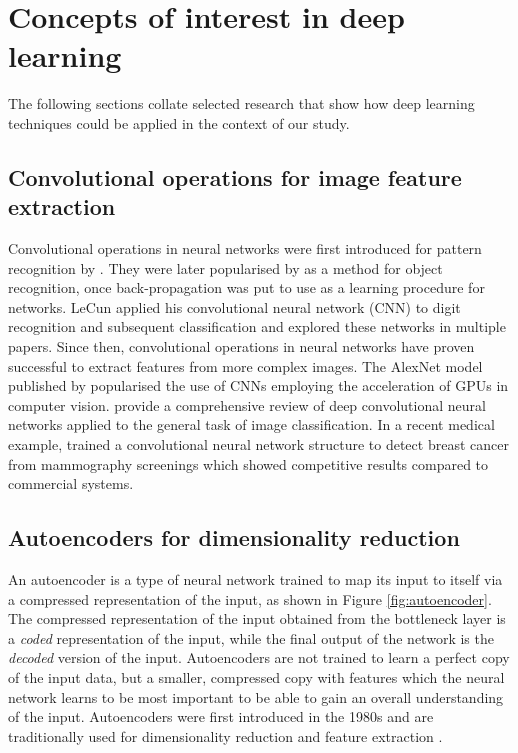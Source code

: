 \section{Concepts of interest in deep learning} \label{sec:deepl_bg}

The following sections collate selected research that show how deep learning techniques could be applied in the context of our study. 

\subsection{Convolutional operations for image feature extraction}

Convolutional operations in neural networks were first introduced for pattern recognition by \citet{fukushima_neocognitron_1980}. They were later popularised by \citet{lecun_1989} as a method for object recognition, once back-propagation was put to use as a learning procedure for networks. LeCun applied his convolutional neural network (CNN) to digit recognition and subsequent classification and explored these networks in multiple papers. Since then, convolutional operations in neural networks have proven successful to extract features from more complex images. The AlexNet model published by \citet{krizhevsky_imagenet_2012} popularised the use of CNNs employing the acceleration of GPUs in computer vision. \citet{rawat_deep_2017} provide a comprehensive review of deep convolutional neural networks applied to the general task of image classification. In a recent medical example, \citet{shen_2019} trained a convolutional neural network structure to detect breast cancer from mammography screenings which showed competitive results compared to commercial systems. 

\subsection{Autoencoders for dimensionality reduction}

An autoencoder is a type of neural network trained to map its input to itself via a compressed representation of the input, as shown in Figure \ref{fig:autoencoder}. The compressed representation of the input obtained from the bottleneck layer is a \textit{coded} representation of the input, while the final output of the network is the \textit{decoded} version of the input. Autoencoders are not trained to learn a perfect copy of the input data, but a smaller, compressed copy with features which the neural network learns to be most important to be able to gain an overall understanding of the input. Autoencoders were first introduced in the 1980s \citep{rumelhart_1986} and are traditionally used for dimensionality reduction and feature extraction \citep{Goodfellow-et-al-2016}. 


